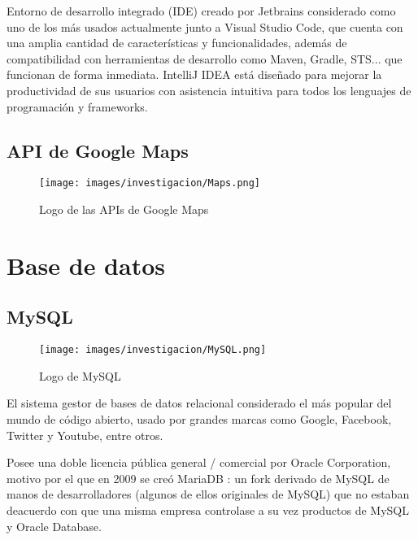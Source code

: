             Entorno de desarrollo integrado (IDE) creado por Jetbrains considerado como uno de los más usados actualmente junto a Visual Studio Code, que cuenta con una amplia cantidad de características y funcionalidades, además de compatibilidad con herramientas de desarrollo como Maven, Gradle, STS... que funcionan de forma inmediata. IntelliJ IDEA está diseñado para mejorar la productividad de sus usuarios con asistencia intuitiva para todos los lenguajes de programación y frameworks.


        \subsection{API de Google Maps}


            \begin{figure*}[h]
            \label{figura:api}

                \centering
                \texttt{[image: images/investigacion/Maps.png]}
                \caption{Logo de las APIs de Google Maps}

            \end{figure*}


    \section{Base de datos}

        \nocite{MySQL}

        \subsection{MySQL}

            \begin{figure*}[h]
            \label{figura:mysql}

                \centering
                \texttt{[image: images/investigacion/MySQL.png]}
                \caption{Logo de MySQL}

            \end{figure*}

            El sistema gestor de bases de datos relacional considerado el más popular del mundo de código abierto, usado por grandes marcas como Google, Facebook, Twitter y Youtube, entre otros.

            Posee una doble licencia pública general / comercial por Oracle Corporation, motivo por el que en 2009 se creó MariaDB \cite{MariaDB}: un fork derivado de MySQL de manos de desarrolladores (algunos de ellos originales de MySQL) que no estaban deacuerdo con que una misma empresa controlase a su vez productos de MySQL y Oracle Database.



